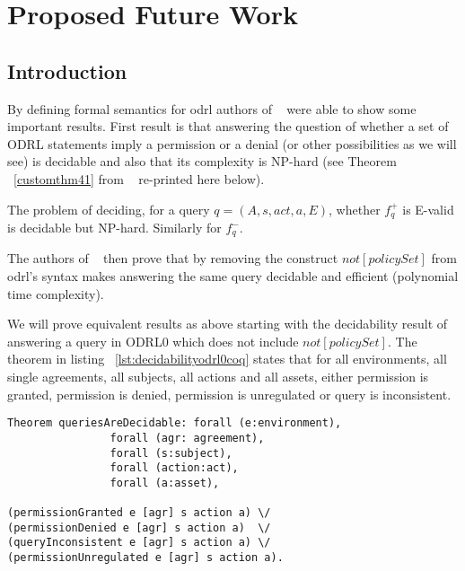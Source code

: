 \chapter{Proposed Future Work}

\section{Introduction}
By defining formal semantics for \ac{odrl} authors of ~\cite{pucella2006} were able to show some important results. First result is that answering the question of whether a set of ODRL statements imply a permission or a denial (or other possibilities as we will see) is decidable and also that its complexity is NP-hard (see Theorem ~\ref{customthm41} from ~\cite{pucella2006} re-printed here below).

\begin{customthm}{4.1}\label{customthm41}
The problem of deciding, for a query $q = (A, s, act, a, E)$, whether $f^{+}_q$ is E-valid is decidable but NP-hard. Similarly for $f^{-}_q$.
\end{customthm}

The authors of ~\cite{pucella2006} then prove that by removing the construct $not[policySet]$ from \ac{odrl}'s syntax makes answering the same query decidable and efficient (polynomial time complexity). 

We will prove equivalent results as above starting with the decidability result of answering a query in ODRL0 which does not include $not[policySet]$. The theorem in listing ~\ref{lst:decidabilityodrl0coq} states that for all environments, all single agreements, all subjects, all actions and all assets, either permission is granted, permission is denied, permission is unregulated or query is inconsistent. 

\begin{minipage}[c]{0.95\textwidth}
\begin{lstlisting}
Theorem queriesAreDecidable: forall (e:environment), 
                forall (agr: agreement),
                forall (s:subject),
                forall (action:act),
                forall (a:asset),

(permissionGranted e [agr] s action a) \/
(permissionDenied e [agr] s action a)  \/
(queryInconsistent e [agr] s action a) \/
(permissionUnregulated e [agr] s action a).

\end{lstlisting}
\end{minipage}

